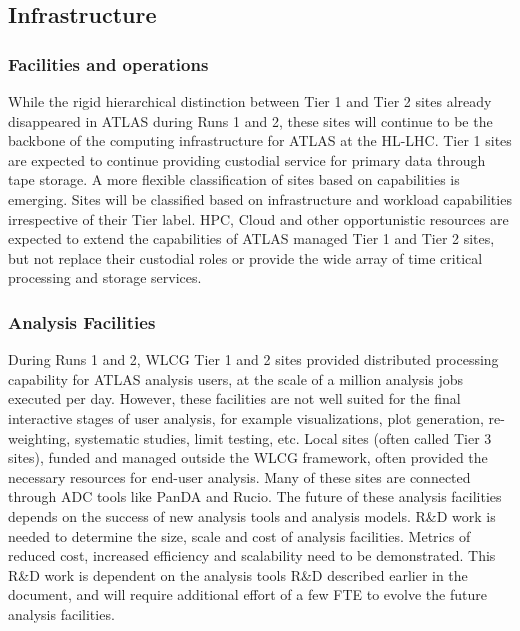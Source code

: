 \subsection{Infrastructure}

\subsubsection{Facilities and operations}


While the rigid hierarchical distinction between Tier 1 and Tier 2 sites already disappeared in ATLAS during Runs 1 and 2, these sites will continue to be the backbone of the computing infrastructure for ATLAS at the HL-LHC. Tier 1 sites are expected to continue providing custodial service for primary data through tape storage. A more flexible classification of sites based on capabilities is emerging. Sites will be classified based on infrastructure and workload capabilities irrespective of their Tier label. HPC, Cloud and other opportunistic resources are expected to extend the capabilities of ATLAS managed Tier 1 and Tier 2 sites, but not replace their custodial roles or provide the wide array of time critical processing and storage services.

\subsubsection{Analysis Facilities}
During Runs 1 and 2, WLCG Tier 1 and 2 sites provided distributed processing capability for ATLAS analysis users, at the scale of a million analysis jobs executed per day. However, these facilities are not well suited for the final interactive stages of user analysis, for example visualizations, plot generation, re-weighting, systematic studies, limit testing, etc. Local sites (often called Tier 3 sites), funded and managed outside the WLCG framework, often provided the necessary resources for end-user analysis. Many of these sites are connected through ADC tools like PanDA and Rucio. The future of these analysis facilities depends on the success of new analysis tools and analysis models. R\&D work is needed to determine the size, scale and cost of analysis facilities. Metrics of reduced cost, increased efficiency and scalability need to be demonstrated. This R\&D work is dependent on the analysis tools R\&D described earlier in the document, and will require additional effort of a few FTE to evolve the future analysis facilities.


